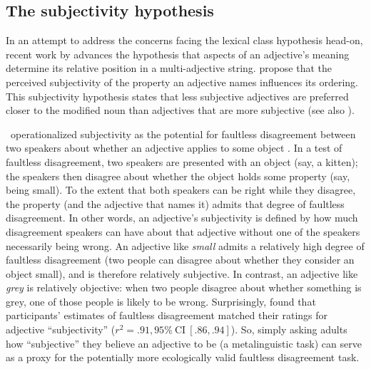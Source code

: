 \documentclass[10pt]{article}
\newcommand{\gcs}[1]{\textcolor{blue}{[gcs: #1]}}
\newcommand{\gkb}[1]{\textcolor{magenta}{[gkb: #1]}}
\begin{document}
\subsection{The subjectivity hypothesis}

In an attempt to address the concerns facing the lexical class hypothesis head-on, recent work by \cite{scontras2017subjectivity} advances the hypothesis that aspects of an adjective's meaning determine its relative position in a multi-adjective string. \citeauthor{scontras2017subjectivity} propose that the perceived subjectivity of the property an adjective names influences its ordering. This subjectivity hypothesis states that less subjective adjectives are preferred closer to the modified noun than adjectives that are more subjective (see also \citealt{hetzron1978relative,hill2012beauty}). %

\citeauthor{scontras2017subjectivity}~operationalized subjectivity as the potential for faultless disagreement between two speakers about whether an adjective applies to some object \citep{barker2013,kennedy2013,kolbel2004}. In a test of faultless disagreement, two speakers are presented with an object (say, a kitten); the speakers then disagree about whether the object holds some property (say, being small). To the extent that both speakers can be right while they disagree, the property (and the adjective that names it) admits that degree of faultless disagreement. %
In other words, an adjective's subjectivity is defined by how much disagreement speakers can have about that adjective without one of the speakers necessarily being wrong. An adjective like \textit{small} admits a relatively high degree of faultless disagreement (two people can disagree about whether they consider an object small), and is therefore relatively subjective. In contrast, an adjective like \textit{grey} is relatively objective: when two people disagree about whether something is grey, one of those people is likely to be wrong. Surprisingly, \citeauthor{scontras2017subjectivity} found that participants' estimates of faultless disagreement matched their ratings for adjective ``subjectivity'' ($r^2 = .91, 95\%\ \textrm{CI}\ [.86, .94]$).
So, simply asking adults how ``subjective'' they believe an adjective to be (a metalinguistic task) can serve as a proxy for the potentially more ecologically valid faultless disagreement task.
\end{document}
